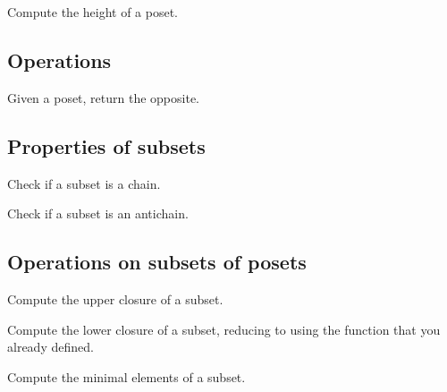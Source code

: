 \begin{gradedexercise}
  Compute the height of a poset.
\end{gradedexercise}

\subsection{Operations}


\begin{gradedexercise}
  Given a poset, return the opposite.
\end{gradedexercise}

\subsection{Properties of subsets}


\begin{gradedexercise}
  Check if a subset is a chain.
\end{gradedexercise}

\begin{gradedexercise}
  Check if a subset is an antichain.
\end{gradedexercise}

\subsection{Operations on subsets of posets}

\begin{gradedexercise}
  Compute the upper closure of a subset.

\end{gradedexercise}


\begin{gradedexercise}
  Compute the lower closure of a subset, reducing to
  using the function  that you
  already defined.

\end{gradedexercise}



\begin{gradedexercise}
  Compute the minimal elements of a subset.


\end{gradedexercise}


